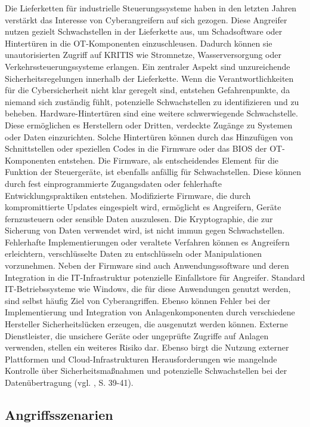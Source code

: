 Die Lieferketten für industrielle Steuerungssysteme haben in den letzten Jahren verstärkt das Interesse von Cyberangreifern auf sich gezogen. Diese Angreifer nutzen gezielt Schwachstellen in der Lieferkette aus, um Schadsoftware oder Hintertüren in die OT-Komponenten einzuschleusen. Dadurch können sie unautorisierten Zugriff auf KRITIS wie Stromnetze, Wasserversorgung oder Verkehrssteuerungssysteme erlangen.
Ein zentraler Aspekt sind unzureichende Sicherheitsregelungen innerhalb der Lieferkette. Wenn die Verantwortlichkeiten für die Cybersicherheit nicht klar geregelt sind, entstehen Gefahrenpunkte, da niemand sich zuständig fühlt, potenzielle Schwachstellen zu identifizieren und zu beheben. Hardware-Hintertüren sind eine weitere schwerwiegende Schwachstelle. Diese ermöglichen es Herstellern oder Dritten, verdeckte Zugänge zu Systemen oder Daten einzurichten. Solche Hintertüren können durch das Hinzufügen von Schnittstellen oder speziellen Codes in die Firmware oder das BIOS der OT-Komponenten entstehen. Die Firmware, als entscheidendes Element für die Funktion der Steuergeräte, ist ebenfalls anfällig für Schwachstellen. \clearpage \noindent Diese können durch fest einprogrammierte Zugangsdaten oder fehlerhafte Entwicklungspraktiken entstehen. Modifizierte Firmware, die durch kompromittierte Updates eingespielt wird, ermöglicht es Angreifern, Geräte fernzusteuern oder sensible Daten auszulesen. Die Kryptographie, die zur Sicherung von Daten verwendet wird, ist nicht immun gegen Schwachstellen. Fehlerhafte Implementierungen oder veraltete Verfahren können es Angreifern erleichtern, verschlüsselte Daten zu entschlüsseln oder Manipulationen vorzunehmen. Neben der Firmware sind auch Anwendungssoftware und deren Integration in die IT-Infrastruktur potenzielle Einfallstore für Angreifer. Standard IT-Betriebssysteme wie Windows, die für diese Anwendungen genutzt werden, sind selbst häufig Ziel von Cyberangriffen. Ebenso können Fehler bei der Implementierung und Integration von Anlagenkomponenten durch verschiedene Hersteller Sicherheitslücken erzeugen, die ausgenutzt werden können. Externe Dienstleister, die unsichere Geräte oder ungeprüfte Zugriffe auf Anlagen verwenden, stellen ein weiteres Risiko dar. Ebenso birgt die Nutzung externer Plattformen und Cloud-Infrastrukturen Herausforderungen wie mangelnde Kontrolle über Sicherheitsmaßnahmen und potenzielle Schwachstellen bei der Datenübertragung (vgl. \cite{ICS}, S. 39-41).

\subsection{Angriffsszenarien}

